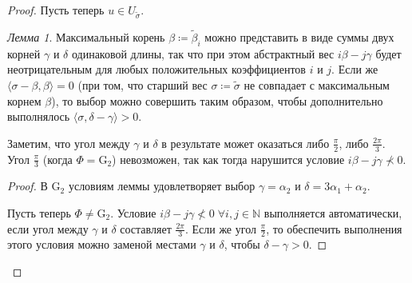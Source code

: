 \documentclass[10pt]{article}
\theoremstyle{remark}
\newtheorem{lm}{Лемма}
\newcommand{\N}{\mathbb{N}}
\begin{document}
\begin{proof}
Пусть теперь $u \in  U_{\widetilde\sigma}$. 
\begin{lm}
Максимальный корень $\beta\coloneqq\widetilde\beta_i$ можно представить в виде суммы двух корней $\gamma$ и $\delta$ одинаковой длины, так что при этом абстрактный вес $i\beta-j\gamma$ будет неотрицательным для любых положительных коэффициентов $i$ и $j$. Если же $\langle\sigma-\beta,\beta\rangle=0$ (при том, что старший вес $\sigma\coloneqq\widetilde\sigma$ не совпадает с максимальным корнем $\beta$), то выбор можно совершить таким образом, чтобы дополнительно выполнялось $\langle\sigma,\delta-\gamma\rangle>0$.

Заметим, что угол между $\gamma$ и $\delta$ в результате может оказаться либо $\frac{\pi}{2}$, либо $\frac{2\pi}{3}$. Угол $\frac{\pi}{3}$ (когда $\Phi = \mathrm{G}_2$) невозможен, так как тогда нарушится условие $i\beta-j\gamma \nprec 0$.
\end{lm}
\begin{proof}
В $\mathrm{G}_2$ условиям леммы удовлетворяет выбор $\gamma=\alpha_2$ и $\delta=3\alpha_1+\alpha_2$.

\begin{center}
\end{center}

Пусть теперь $\Phi\ne\mathrm{G}_2$. Условие $i\beta-j\gamma\nless0\;\forall i,j\in\N$ выполняется автоматически, если угол между $\gamma$ и $\delta$ составляет $\frac{2\pi}{3}$. Если же угол $\frac{\pi}{2}$, то обеспечить выполнения этого условия можно заменой местами $\gamma$ и $\delta$, чтобы $\delta-\gamma>0$.


\end{proof}
\end{proof}
\end{document}

